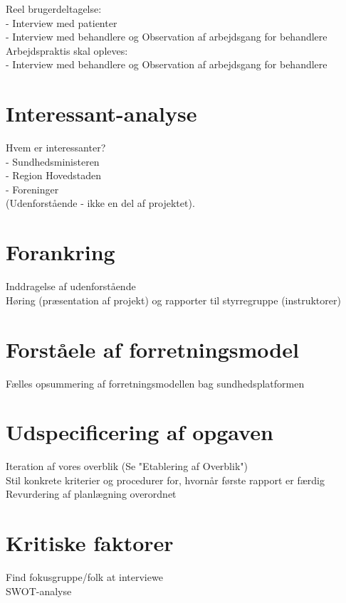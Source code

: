 \documentclass{article}
\begin{document}
Reel brugerdeltagelse:\\ 
- Interview med patienter\\
- Interview med behandlere og Observation af arbejdsgang for behandlere
\\
Arbejdspraktis skal opleves:\\
- Interview med behandlere og Observation af arbejdsgang for behandlere

\section{Interessant-analyse}

Hvem er interessanter?\\
- Sundhedsministeren\\
- Region Hovedstaden\\
- Foreninger\\
(Udenforstående - ikke en del af projektet).

\section{Forankring}

Inddragelse af udenforstående\\
Høring (præsentation af projekt) og rapporter til styrregruppe (instruktorer)

\section{Forståele af forretningsmodel}

Fælles opsummering af forretningsmodellen bag sundhedsplatformen

\section{Udspecificering af opgaven}

Iteration af vores overblik (Se "Etablering af Overblik")
\\
Stil konkrete kriterier og procedurer for, hvornår første rapport er færdig
\\
Revurdering af planlægning overordnet

\section{Kritiske faktorer}

Find fokusgruppe/folk at interviewe
\\
SWOT-analyse
\end{document}
